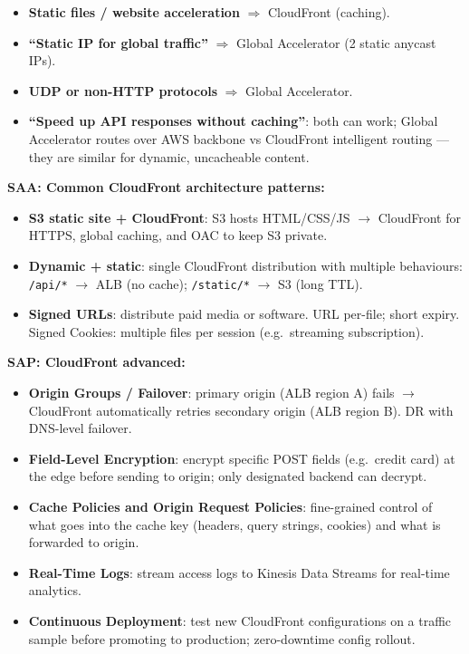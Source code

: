 \begin{examtip}
\begin{itemize}
  \item \textbf{Static files / website acceleration} $\Rightarrow$ CloudFront (caching).
  \item \textbf{``Static IP for global traffic''} $\Rightarrow$ Global Accelerator (2 static anycast IPs).
  \item \textbf{UDP or non-HTTP protocols} $\Rightarrow$ Global Accelerator.
  \item \textbf{``Speed up API responses without caching''}: both can work; Global Accelerator
        routes over AWS backbone vs CloudFront intelligent routing --- they are similar for
        dynamic, uncacheable content.
\end{itemize}
\end{examtip}

\begin{saadepth}
\textbf{SAA: Common CloudFront architecture patterns:}
\begin{itemize}
  \item \textbf{S3 static site + CloudFront}: S3 hosts HTML/CSS/JS $\rightarrow$ CloudFront for
        HTTPS, global caching, and OAC to keep S3 private.
  \item \textbf{Dynamic + static}: single CloudFront distribution with multiple behaviours:
        \texttt{/api/*} $\rightarrow$ ALB (no cache); \texttt{/static/*} $\rightarrow$ S3 (long TTL).
  \item \textbf{Signed URLs}: distribute paid media or software. URL per-file; short expiry.
        Signed Cookies: multiple files per session (e.g.\ streaming subscription).
\end{itemize}
\end{saadepth}

\begin{sapdepth}
\textbf{SAP: CloudFront advanced:}
\begin{itemize}
  \item \textbf{Origin Groups / Failover}: primary origin (ALB region A) fails $\rightarrow$
        CloudFront automatically retries secondary origin (ALB region B). DR with DNS-level failover.
  \item \textbf{Field-Level Encryption}: encrypt specific POST fields (e.g.\ credit card) at
        the edge before sending to origin; only designated backend can decrypt.
  \item \textbf{Cache Policies and Origin Request Policies}: fine-grained control of what goes
        into the cache key (headers, query strings, cookies) and what is forwarded to origin.
  \item \textbf{Real-Time Logs}: stream access logs to Kinesis Data Streams for real-time analytics.
  \item \textbf{Continuous Deployment}: test new CloudFront configurations on a traffic sample
        before promoting to production; zero-downtime config rollout.
\end{itemize}
\end{sapdepth}
